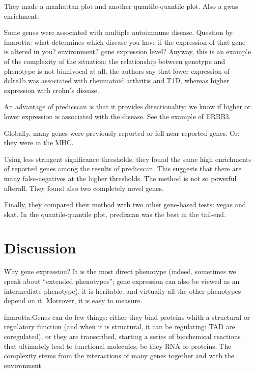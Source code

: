 \documentclass[../main.tex]{subfiles}
\begin{document}
They made a manhattan plot and another quantile-quantile plot. Also a 
gwas enrichment.

Some genes were associated with multiple autoimmune disease. Question by 
fmarotta: what determines which disease you have if the expression of 
that gene is altered in you? environment? gene expression level? Anyway, 
this is an example of the complexity of the situation: the relationship 
between genotype and phenotype is not biunivocal at all. the authors say 
that lower expression of dclre1b was associated with rheumatoid 
arthritis and T1D, whereas higher expression with crohn's disease.

An advantage of predicscan is that it provides directionality: we know 
if higher or lower expression is associated with the disease. See the 
example of ERBB3.

Globally, many genes were previously reported or fell near reported 
genes. Or: they were in the MHC.

Using less stringent significance thresholds, they found the same high 
enrichments of reported genes among the results of predicscan. This 
suggests that there are many false-negatives at the higher thresholds. 
The method is not so powerful afterall. They found also two completely 
novel genes.

Finally, they compared their method with two other gene-based tests: 
vegas and skat. In the quantile-quantile plot, predixcan was the best in 
the tail-end.

\section{Discussion}

Why gene expression? It is the most direct phenotype (indeed, sometimes 
we speak about \enquote{extended phenotypes}; gene expression can also 
be viewed as an intermediate phenotype), it is heritable, and virtually 
all the other phenotypes depend on it. Moreover, it is easy to measure.

fmarotta:Genes can do few things: either they bind proteins whith a 
structural or regulatory function (and when it is structural, it can be 
regulating: TAD are coregulated), or they are transcribed, starting a 
series of biochemical reactions that ultimately lead to functional 
molecules, be they RNA or proteins. The complexity stems from the 
interactions of many genes together and with the environment
\end{document}
